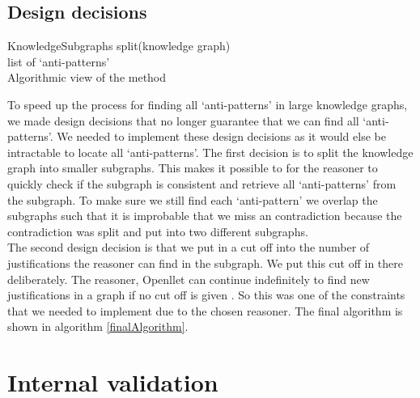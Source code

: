 \documentclass[11pt,letterpaper ,oneside ]{book}
\begin{document}
	\section{Design decisions}
		\begin{algorithm}
		KnowledgeSubgraphs split(knowledge graph)\\
		
		\Return list of `anti-patterns'\\
		\caption{Algorithmic view of the method}
		\label{finalAlgorithm}
	\end{algorithm}
	To speed up the process for finding all `anti-patterns' in large knowledge graphs, we made design decisions that no longer guarantee that we can find all `anti-patterns'. We needed to implement these design decisions as it would else be intractable to locate all `anti-patterns'. 
	The first decision is to split the knowledge graph into smaller subgraphs. This makes it possible to for the reasoner to quickly check if the subgraph is consistent and retrieve all `anti-patterns' from the subgraph. To make sure we still find each `anti-pattern' we overlap the subgraphs such that it is improbable that we miss an contradiction because the contradiction was split and put into two different subgraphs.\\
	The second design decision is that we put in a cut off into the number of justifications the reasoner can find in the subgraph. We put this cut off in there deliberately. The reasoner, Openllet can continue indefinitely to find new justifications in a graph if no cut off is given \cite{Openllet:2019}. So this was one of the constraints that we needed to implement due to the chosen reasoner. 
	The final algorithm is shown in algorithm \ref{finalAlgorithm}.\\


	
	\newpage
	
	\chapter{Internal validation}\label{internalvalidation}
	
\end{document}
